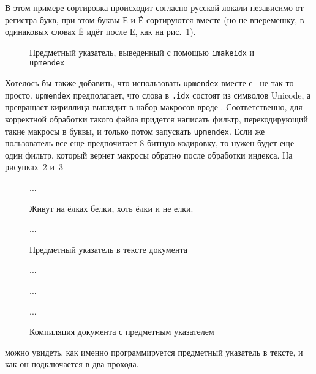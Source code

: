 \documentclass[a4paper,12pt,hyphens]{article}
\newcommand\package[1]{\texttt{#1}}
\newcommand\exe[1]{\texttt{#1}}
\newcommand\file[1]{\texttt{#1}}
\newcommand\lcmd[1]{\texttt{#1}}
\begin{document}
В этом примере сортировка происходит согласно русской локали независимо от регистра букв, при этом буквы
Е и Ё сортируются вместе (но не вперемешку, в одинаковых словах Ё идёт после Е,
как на рис.~\ref{upmendex4}).
\begin{figure}[tp]
\begin{tcolorbox}[colback=white,colframe=white]
\small
\vspace*{-2ex}
\printindex
\end{tcolorbox}
\caption{Предметный указатель, выведенный с помощью \package{imakeidx} и
\exe{upmendex}}\label{upmendex4}
\end{figure}
Хотелось бы также добавить, что использовать \exe{upmendex} вместе с \pdfLaTeX\ не так-то просто. \exe{upmendex} предполагает, что слова в \file{.idx} состоят из символов Unicode,
а \pdfLaTeX превращает кириллица выглядит в набор макросов вроде \lcmd{\IeC {\cyrp }}. Соответственно, для корректной обработки такого файла придется написать фильтр, перекодирующий такие макросы в буквы, и только потом запускать \exe{upmendex}. Если же пользователь все еще предпочитает 8-битную кодировку, то нужен будет еще один фильтр, который вернет макросы обратно после обработки индекса.
На рисунках~\ref{upmendex2} и~\ref{upmendex3}%
\begin{figure}[tp]
\begin{latexcode}
\usepackage[noautomatic]{imakeidx}
\makeindex

...

Живут на ёлках белки, хоть ёлки и не елки.

...

\printindex
\end{latexcode}
\caption{Предметный указатель в тексте документа}\label{upmendex2}
\end{figure}%
\begin{figure}[tp]
\begin{shcode}

...


...


...

%
\end{shcode}
\caption{Компиляция документа с предметным указателем}\label{upmendex3}
\end{figure}
можно увидеть, как именно программируется предметный указатель в тексте, и как он подключается в два прохода.
\end{document}

